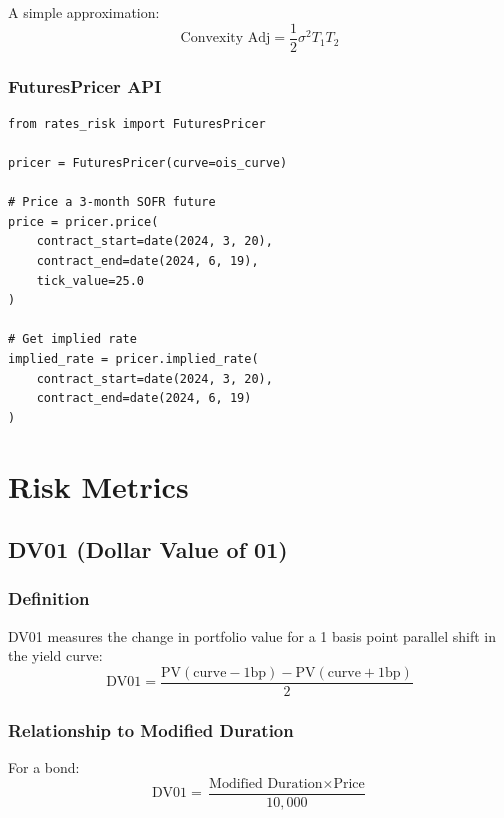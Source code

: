 \documentclass[12pt,a4paper]{report}
\newcommand{\pv}{\text{PV}}
\begin{document}
A simple approximation:
\begin{equation}
    \text{Convexity Adj} = \frac{1}{2} \sigma^2 T_1 T_2
\end{equation}

\subsection{FuturesPricer API}

\begin{lstlisting}
from rates_risk import FuturesPricer

pricer = FuturesPricer(curve=ois_curve)

# Price a 3-month SOFR future
price = pricer.price(
    contract_start=date(2024, 3, 20),
    contract_end=date(2024, 6, 19),
    tick_value=25.0
)

# Get implied rate
implied_rate = pricer.implied_rate(
    contract_start=date(2024, 3, 20),
    contract_end=date(2024, 6, 19)
)
\end{lstlisting}

\chapter{Risk Metrics}

\section{DV01 (Dollar Value of 01)}

\subsection{Definition}

DV01 measures the change in portfolio value for a 1 basis point parallel shift in the yield curve:
\begin{equation}
    \text{DV01} = \frac{\pv(\text{curve} - 1\text{bp}) - \pv(\text{curve} + 1\text{bp})}{2}
\end{equation}

\subsection{Relationship to Modified Duration}

For a bond:
\begin{equation}
    \text{DV01} = \frac{\text{Modified Duration} \times \text{Price}}{10{,}000}
\end{equation}
\end{document}
